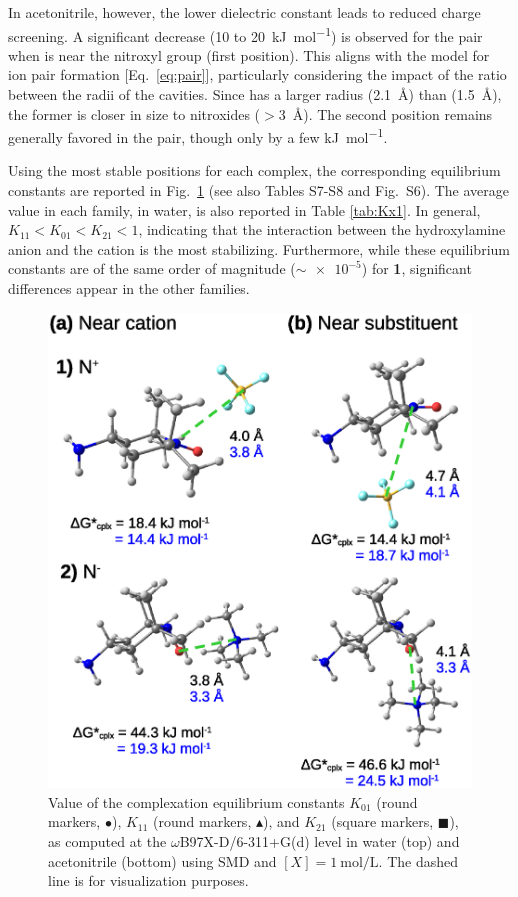 \documentclass[review,preprint]{elsarticle}
\begin{document}
In acetonitrile, however, the lower dielectric constant leads to reduced charge screening. A significant decrease (10 to \SI{20}{\kilo\joule\per\mole}) is observed for the  pair when  is near the nitroxyl group (first position). This aligns with the model for ion pair formation [Eq.~\eqref{eq:pair}], particularly considering the impact of the ratio between the radii of the cavities. Since  has a larger radius (\SI{2.1}{\angstrom}) than  (\SI{1.5}{\angstrom}), the former is closer in size to nitroxides ($>$\SI{3}{\angstrom}). The second position remains generally favored in the  pair, though only by a few \si{\kilo\joule\per\mole}.

Using the most stable positions for each complex, the corresponding equilibrium constants are reported in Fig.~\ref{fig:Kx1} (see also Tables S7-S8 and Fig.~S6). The average value in each family, in water, is also reported in Table \ref{tab:Kx1}. In general, $K_{11} < K_{01} < K_{21} < 1$, indicating that the interaction between the hydroxylamine anion and the cation is the most stabilizing. Furthermore, while these equilibrium constants are of the same order of magnitude ($\sim \num{e-5}$) for \textbf{1}, significant differences appear in the other families.

\begin{figure}[!h]
	\centering
	\includegraphics[width=\linewidth]{Figure13}
	\caption{Value of the complexation equilibrium constants $K_{01}$ (round markers, $\bullet$), $K_{11}$ (round markers, $\blacktriangle$), and $K_{21}$ (square markers, $\blacksquare$), as computed at the $\omega$B97X-D/6-311+G(d) level in water (top) and acetonitrile (bottom) using SMD and $[X]=\SI{1}{\mole\per\liter}$. The dashed line is for visualization purposes.}
	\label{fig:Kx1}
\end{figure}
\end{document}
